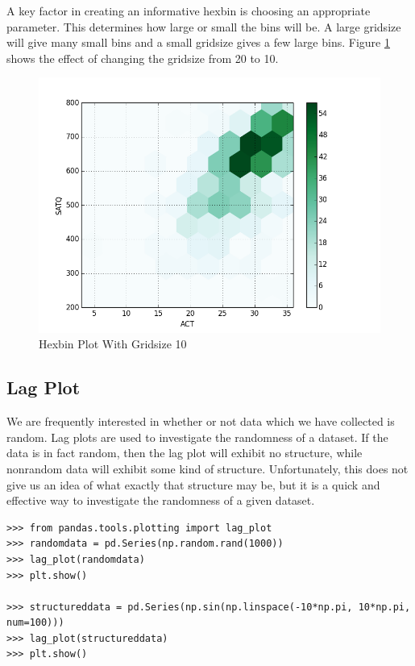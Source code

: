 A key factor in creating an informative hexbin is choosing an appropriate  parameter. This determines how large or small the bins will be. A large gridsize will give many small bins and a small gridsize gives a few large bins. Figure \ref{fig:hex} shows the effect of changing the gridsize from 20 to 10.

\begin{figure}[H]
    \centering
    \includegraphics[width=.75\textwidth]{hexbin.png}
    \caption{Hexbin Plot With Gridsize 10}
    \label{fig:hex}
\end{figure}


\subsection*{Lag Plot}
 We are frequently interested in whether or not data which we have collected is random. Lag plots are used to investigate the randomness of a dataset. If the data is in fact random, then the lag plot will exhibit no structure, while nonrandom data will exhibit some kind of structure. Unfortunately, this does not give us an idea of what exactly that structure may be, but it is a quick and effective way to investigate the randomness of a given dataset.
\begin{lstlisting}
>>> from pandas.tools.plotting import lag_plot
>>> randomdata = pd.Series(np.random.rand(1000))
>>> lag_plot(randomdata)
>>> plt.show()

>>> structureddata = pd.Series(np.sin(np.linspace(-10*np.pi, 10*np.pi, num=100)))
>>> lag_plot(structureddata)
>>> plt.show()
\end{lstlisting}


